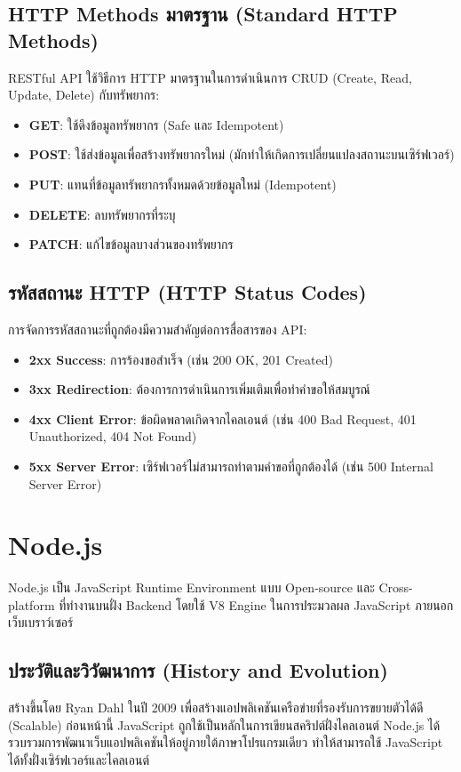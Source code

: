 \subsection{HTTP Methods มาตรฐาน (Standard HTTP Methods)}
RESTful API ใช้วิธีการ HTTP มาตรฐานในการดำเนินการ CRUD (Create, Read, Update, Delete) กับทรัพยากร:
\begin{itemize}
    \item \textbf{GET}: ใช้ดึงข้อมูลทรัพยากร (Safe และ Idempotent)
    \item \textbf{POST}: ใช้ส่งข้อมูลเพื่อสร้างทรัพยากรใหม่ (มักทำให้เกิดการเปลี่ยนแปลงสถานะบนเซิร์ฟเวอร์)
    \item \textbf{PUT}: แทนที่ข้อมูลทรัพยากรทั้งหมดด้วยข้อมูลใหม่ (Idempotent)
    \item \textbf{DELETE}: ลบทรัพยากรที่ระบุ
    \item \textbf{PATCH}: แก้ไขข้อมูลบางส่วนของทรัพยากร
\end{itemize}

\subsection{รหัสสถานะ HTTP (HTTP Status Codes)}
การจัดการรหัสสถานะที่ถูกต้องมีความสำคัญต่อการสื่อสารของ API:
\begin{itemize}
    \item \textbf{2xx Success}: การร้องขอสำเร็จ (เช่น 200 OK, 201 Created)
    \item \textbf{3xx Redirection}: ต้องการการดำเนินการเพิ่มเติมเพื่อทำคำขอให้สมบูรณ์
    \item \textbf{4xx Client Error}: ข้อผิดพลาดเกิดจากไคลเอนต์ (เช่น 400 Bad Request, 401 Unauthorized, 404 Not Found)
    \item \textbf{5xx Server Error}: เซิร์ฟเวอร์ไม่สามารถทำตามคำขอที่ถูกต้องได้ (เช่น 500 Internal Server Error)
\end{itemize}

\section{Node.js}
Node.js เป็น JavaScript Runtime Environment แบบ Open-source และ Cross-platform ที่ทำงานบนฝั่ง Backend โดยใช้ V8 Engine ในการประมวลผล JavaScript ภายนอกเว็บเบราว์เซอร์

\subsection{ประวัติและวิวัฒนาการ (History and Evolution)}
สร้างขึ้นโดย Ryan Dahl ในปี 2009 เพื่อสร้างแอปพลิเคชันเครือข่ายที่รองรับการขยายตัวได้ดี (Scalable) ก่อนหน้านี้ JavaScript ถูกใช้เป็นหลักในการเขียนสคริปต์ฝั่งไคลเอนต์ Node.js ได้รวบรวมการพัฒนาเว็บแอปพลิเคชันให้อยู่ภายใต้ภาษาโปรแกรมเดียว ทำให้สามารถใช้ JavaScript ได้ทั้งฝั่งเซิร์ฟเวอร์และไคลเอนต์

